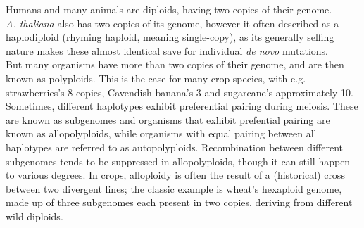 Humans and many animals are diploids, having two copies of their genome. \\ %
\textit{A. thaliana} also has two copies of its genome, however it often described as a haplodiploid (rhyming haploid, meaning single-copy), as its generally selfing nature makes these almost identical save for individual \textit{de novo} mutations.
\\
But many organisms have more than two copies of their genome, and are then known as polyploids.
This is the case for many crop species, with e.g. strawberries's 8 copies, Cavendish banana's 3 and sugarcane's approximately 10\cite{healey24}.
Sometimes, different haplotypes exhibit preferential pairing during meiosis.
These are known as subgenomes and organisms that exhibit prefential pairing are known as allopolyploids, while organisms with equal pairing between all haplotypes are referred to as autopolyploids.
Recombination between different subgenomes tends to be suppressed in allopolyploids, though it can still happen to various degrees\cite{mason20}.
In crops, alloploidy is often the result of a (historical) cross between two divergent lines; the classic example is wheat's hexaploid genome, made up of three subgenomes each present in two copies, deriving from different wild diploids\cite{iwgsc18}.

